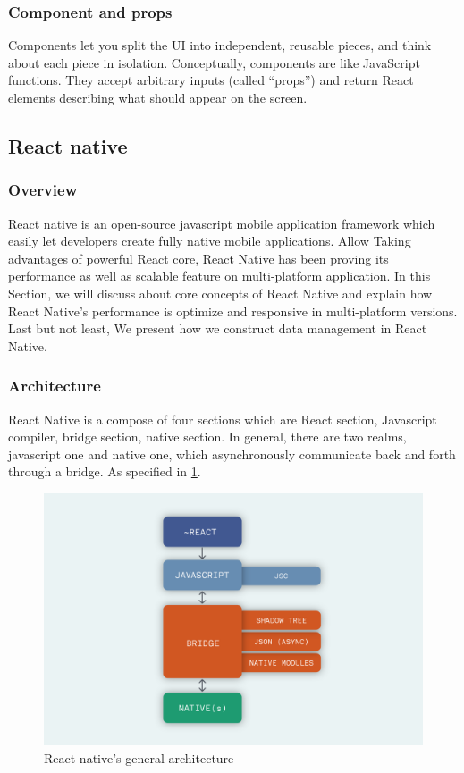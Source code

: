 \subsubsection{Component and props}
\par{
	Components let you split the UI into independent, reusable pieces, and think about each piece in isolation.
	Conceptually, components are like JavaScript functions. They accept arbitrary inputs (called “props”) and return React elements describing what should appear on the screen.
	}
\subsection{React native}
\subsubsection{Overview}
React native is an open-source javascript mobile application 
framework which easily let developers create fully native 
mobile applications. Allow Taking advantages of powerful React core, 
React Native has been proving its performance as well as scalable 
feature on multi-platform application. In this Section, we will 
discuss about core concepts of React Native and explain how React 
Native's performance is optimize and responsive in multi-platform versions. 
Last but not least, We present how we construct data management in React Native.\\
\subsubsection{Architecture}
React Native is a compose of four sections which are React section, Javascript compiler, bridge section, native section. In general, there are two realms, javascript one and native one, which asynchronously communicate back and forth through a bridge. As specified in \ref{fig:RN-architecture}.\\
	
\begin{figure}[!h]
		\centering
		\includegraphics[scale=0.4]{Picture/mobile/RN-architecture.png}
		\caption{React native's general architecture}
	\label{fig:RN-architecture}
\end{figure}
	
